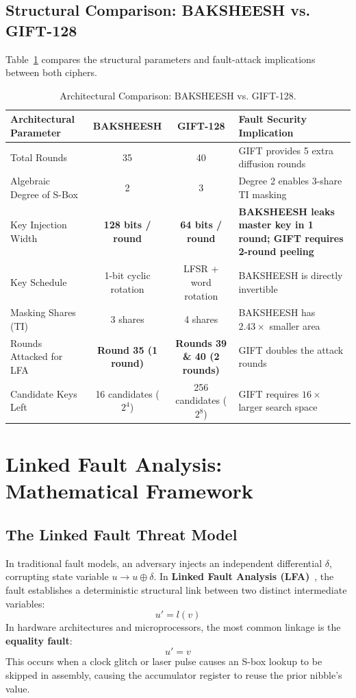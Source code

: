\documentclass[12pt,a4paper,oneside]{report}
\begin{document}
\section{Structural Comparison: BAKSHEESH vs. GIFT-128}
\label{sec:cipher_comparison}
Table~\ref{tab:cipher_comparison} compares the structural parameters and fault-attack implications between both ciphers.

\begin{table}[!htbp]
\centering
\caption{Architectural Comparison: BAKSHEESH vs. GIFT-128.}
\label{tab:cipher_comparison}
\begin{tabular}{lccp{5.5cm}}
\toprule
\textbf{Architectural Parameter} & \textbf{BAKSHEESH} & \textbf{GIFT-128} & \textbf{Fault Security Implication} \\
\midrule
Total Rounds & 35 & 40 & GIFT provides 5 extra diffusion rounds \\
Algebraic Degree of S-Box & 2 & 3 & Degree 2 enables 3-share TI masking \\
Key Injection Width & \textbf{128 bits / round} & \textbf{64 bits / round} & \textbf{BAKSHEESH leaks master key in 1 round; GIFT requires 2-round peeling} \\
Key Schedule & 1-bit cyclic rotation & LFSR + word rotation & BAKSHEESH is directly invertible \\
Masking Shares (TI) & 3 shares & 4 shares & BAKSHEESH has $2.43\times$ smaller area \\
Rounds Attacked for LFA & \textbf{Round 35 (1 round)} & \textbf{Rounds 39 \& 40 (2 rounds)} & GIFT doubles the attack rounds \\
Candidate Keys Left & 16 candidates ($2^4$) & 256 candidates ($2^8$) & GIFT requires $16\times$ larger search space \\
\bottomrule
\end{tabular}
\end{table}

\chapter{Linked Fault Analysis: Mathematical Framework}
\label{ch:lfa}

\section{The Linked Fault Threat Model}
\label{sec:lfa_model}
In traditional fault models, an adversary injects an independent differential $\delta$, corrupting state variable $u \to u \oplus \delta$. In \textbf{Linked Fault Analysis (LFA)}~\cite{beigizad2024linked}, the fault establishes a deterministic structural link between two distinct intermediate variables:
\begin{equation}
    u' = l(v)
\end{equation}
In hardware architectures and microprocessors, the most common linkage is the \textbf{equality fault}:
\begin{equation}
    u' = v
\end{equation}
This occurs when a clock glitch or laser pulse causes an S-box lookup to be skipped in assembly, causing the accumulator register to reuse the prior nibble's value.
\end{document}
